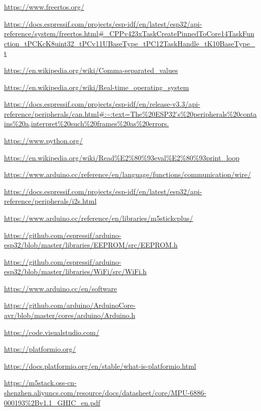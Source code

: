 \documentclass[12pt,oneside,a4paper]{book}
\theoremstyle{break}
\begin{document}
\begin{thebibliography}{00}
    \url{https://www.freertos.org/}

    \url{https://docs.espressif.com/projects/esp-idf/en/latest/esp32/api-reference/system/freertos.html#_CPPv423xTaskCreatePinnedToCore14TaskFunction_tPCKcK8uint32_tPCv11UBaseType_tPC12TaskHandle_tK10BaseType_t}

    \url{https://en.wikipedia.org/wiki/Comma-separated_values}

    \url{https://en.wikipedia.org/wiki/Real-time_operating_system}

    \url{https://docs.espressif.com/projects/esp-idf/en/release-v3.3/api-reference/peripherals/can.html#:~:text=The%20ESP32's%20peripherals%20contains%20a,interpret%20such%20frames%20as%20errors.}

    \url{https://www.python.org/}

    \url{https://en.wikipedia.org/wiki/Read%E2%80%93eval%E2%80%93print_loop}

    \url{https://www.arduino.cc/reference/en/language/functions/communication/wire/}

    \url{https://docs.espressif.com/projects/esp-idf/en/latest/esp32/api-reference/peripherals/i2s.html}

    \url{https://www.arduino.cc/reference/en/libraries/m5stickcplus/}

    \url{https://github.com/espressif/arduino-esp32/blob/master/libraries/EEPROM/src/EEPROM.h}

    \url{https://github.com/espressif/arduino-esp32/blob/master/libraries/WiFi/src/WiFi.h}

    \url{https://www.arduino.cc/en/software}

    \url{https://github.com/arduino/ArduinoCore-avr/blob/master/cores/arduino/Arduino.h}

    \url{https://code.visualstudio.com/}

    \url{https://platformio.org/}

    \url{https://docs.platformio.org/en/stable/what-is-platformio.html}
    
    \url{https://m5stack.oss-cn-shenzhen.aliyuncs.com/resource/docs/datasheet/core/MPU-6886-000193%2Bv1.1_GHIC_en.pdf}


\end{thebibliography}
\end{document}
